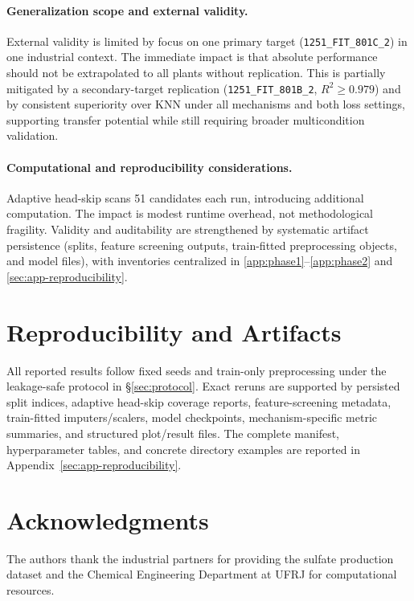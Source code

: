 \paragraph{Generalization scope and external validity.}
External validity is limited by focus on one primary target (\texttt{1251\_FIT\_801C\_2}) in one industrial context. The immediate impact is that absolute performance should not be extrapolated to all plants without replication. This is partially mitigated by a secondary-target replication (\texttt{1251\_FIT\_801B\_2}, $R^2\ge 0.979$) and by consistent superiority over KNN under all mechanisms and both loss settings, supporting transfer potential while still requiring broader multicondition validation.

\paragraph{Computational and reproducibility considerations.}
Adaptive head-skip scans 51 candidates each run, introducing additional computation. The impact is modest runtime overhead, not methodological fragility. Validity and auditability are strengthened by systematic artifact persistence (splits, feature screening outputs, train-fitted preprocessing objects, and model files), with inventories centralized in \ref{app:phase1}--\ref{app:phase2} and \ref{sec:app-reproducibility}.


\section{Reproducibility and Artifacts}\label{sec:reproducibility}

All reported results follow fixed seeds and train-only preprocessing under the leakage-safe protocol in \S\ref{sec:protocol}. Exact reruns are supported by persisted split indices, adaptive head-skip coverage reports, feature-screening metadata, train-fitted imputers/scalers, model checkpoints, mechanism-specific metric summaries, and structured plot/result files. The complete manifest, hyperparameter tables, and concrete directory examples are reported in Appendix~\ref{sec:app-reproducibility}.




\section*{Acknowledgments}

The authors thank the industrial partners for providing the sulfate production dataset and the Chemical Engineering Department at UFRJ for computational resources.